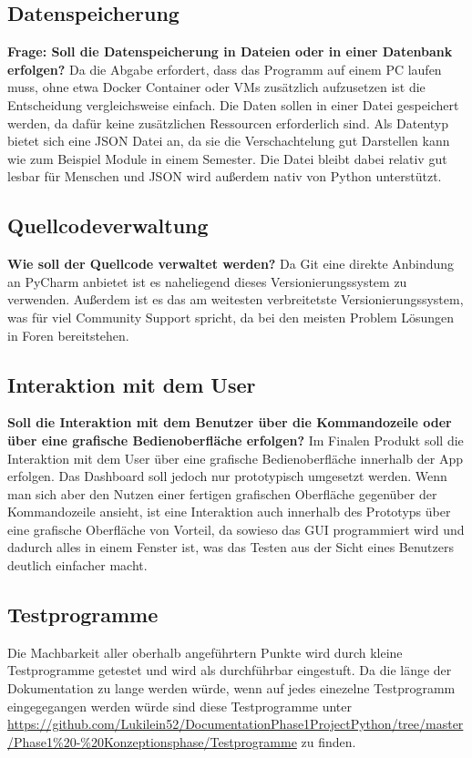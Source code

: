 \subsection{Datenspeicherung}

\textbf{Frage: Soll die Datenspeicherung in Dateien oder in einer Datenbank erfolgen?}
\newline
Da die Abgabe erfordert, dass das Programm auf einem PC laufen muss, ohne etwa Docker Container oder VMs zusätzlich aufzusetzen ist die Entscheidung vergleichsweise einfach. Die Daten sollen in einer Datei gespeichert werden, da dafür keine zusätzlichen Ressourcen erforderlich sind. Als Datentyp bietet sich eine JSON Datei an, da sie die Verschachtelung gut Darstellen kann wie zum Beispiel Module in einem Semester. Die Datei bleibt dabei relativ gut lesbar für Menschen und JSON wird außerdem nativ von Python unterstützt.

\subsection{Quellcodeverwaltung}

\textbf{Wie soll der Quellcode verwaltet werden?}
\newline
Da Git eine direkte Anbindung an PyCharm anbietet ist es naheliegend dieses Versionierungssystem zu verwenden. Außerdem ist es das am weitesten verbreitetste Versionierungssystem, was für viel Community Support spricht, da bei den meisten Problem Lösungen in Foren bereitstehen.

\subsection{Interaktion mit dem User}

\textbf{Soll die Interaktion mit dem Benutzer über die Kommandozeile oder über eine grafische Bedienoberfläche erfolgen?}
\newline
Im Finalen Produkt soll die Interaktion mit dem User über eine grafische Bedienoberfläche innerhalb der App erfolgen. Das Dashboard soll jedoch nur prototypisch umgesetzt werden. Wenn man sich aber den Nutzen einer fertigen grafischen Oberfläche gegenüber der Kommandozeile ansieht, ist eine Interaktion auch innerhalb des Prototyps über eine grafische Oberfläche von Vorteil, da sowieso das GUI programmiert wird und dadurch alles in einem Fenster ist, was das Testen aus der Sicht eines Benutzers deutlich einfacher macht.
\subsection{Testprogramme}
Die Machbarkeit aller oberhalb angeführtern Punkte wird durch kleine Testprogramme getestet und wird als durchführbar eingestuft. Da die länge der Dokumentation zu lange werden würde, wenn auf jedes einezelne Testprogramm eingegegangen werden würde sind diese Testprogramme unter \url{https://github.com/Lukilein52/DocumentationPhase1ProjectPython/tree/master/Phase1%20-%20Konzeptionsphase/Testprogramme} zu finden.